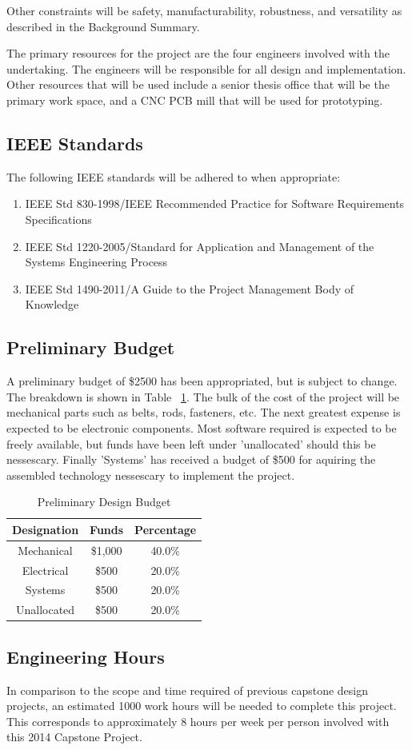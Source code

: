 \documentclass[11pt]{report}
\begin{document}
\par Other constraints will be safety, manufacturability, robustness, and versatility as described in the Background Summary.

\par The primary resources for the project are the four engineers involved with the undertaking. The engineers will be responsible for all design and implementation. Other resources that will be used include a senior thesis office that will be the primary work space, and a CNC PCB mill that will be used for prototyping.

\subsection{IEEE Standards}
\par The following IEEE standards will be adhered to when appropriate:
\begin{enumerate} \parskip2pt
	\item IEEE Std 830-1998/IEEE Recommended Practice for Software Requirements Speciﬁcations
	\item IEEE Std 1220-2005/Standard for Application and Management of the Systems Engineering Process
	\item IEEE Std 1490-2011/A Guide to the Project Management Body of Knowledge
\end{enumerate}

\subsection{Preliminary Budget}
\par A preliminary budget of \$2500 has been appropriated, but is subject to change. The breakdown is shown in Table ~\ref{table:budget}. The bulk of the cost of the project will be mechanical parts such as belts, rods, fasteners, etc. The next greatest expense is expected to be electronic components. Most software required is expected to be freely available, but funds have been left under 'unallocated' should this be nessescary. Finally 'Systems' has received a budget of \$500 for aquiring the assembled technology nessescary to implement the project. 

\begin{table}[ht] 
	\centering 
	\begin{tabular}{c c c} 
		Designation	& Funds 		& Percentage\\
		\hline
		Mechanical	& \$1,000 	& 40.0\% \\ 
		Electrical	& \$500 		& 20.0\% \\ 
		Systems		& \$500 		& 20.0\% \\ 
		Unallocated	& \$500 		& 20.0\% \\
	\end{tabular} 
	\caption{Preliminary Design Budget}
	\label{table:budget}
\end{table}

\subsection{Engineering Hours}
\par In comparison to the scope and time required of previous capstone design projects, an estimated 1000 work hours will be needed to complete this project. This corresponds to approximately 8 hours per week per person involved with this 2014 Capstone Project.
\end{document}
